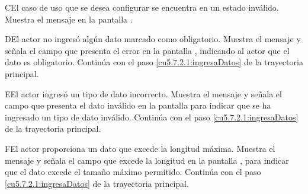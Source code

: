  \begin{UCtrayectoriaA}{C}{El caso de uso que se desea configurar se encuentra en un estado inválido.}
    \UCpaso[\UCsist] Muestra el mensaje  en la pantalla .
 \end{UCtrayectoriaA}

 \begin{UCtrayectoriaA}{D}{El actor no ingresó algún dato marcado como obligatorio.}
    \UCpaso[\UCsist] Muestra el mensaje  y señala el campo que presenta el error en la pantalla 
        , indicando al actor que el dato es obligatorio.
    \UCpaso[] Continúa con el paso \ref{cu5.7.2.1:ingresaDatos} de la trayectoria principal.
 \end{UCtrayectoriaA}

 \begin{UCtrayectoriaA}{E}{El actor ingresó un tipo de dato incorrecto.}
    \UCpaso[\UCsist] Muestra el mensaje  y señala el campo que presenta el dato inválido en la 
    pantalla  para indicar que se ha ingresado un tipo de dato inválido.
    \UCpaso[] Continúa con el paso \ref{cu5.7.2.1:ingresaDatos} de la trayectoria principal.
 \end{UCtrayectoriaA}
 \begin{UCtrayectoriaA}{F}{El actor proporciona un dato que excede la longitud máxima.}
    \UCpaso[\UCsist] Muestra el mensaje  y señala el campo que excede la 
    longitud en la pantalla , para indicar que el dato excede el tamaño máximo permitido.
    \UCpaso[] Continúa con el paso \ref{cu5.7.2.1:ingresaDatos} de la trayectoria principal.
 \end{UCtrayectoriaA}
 
 